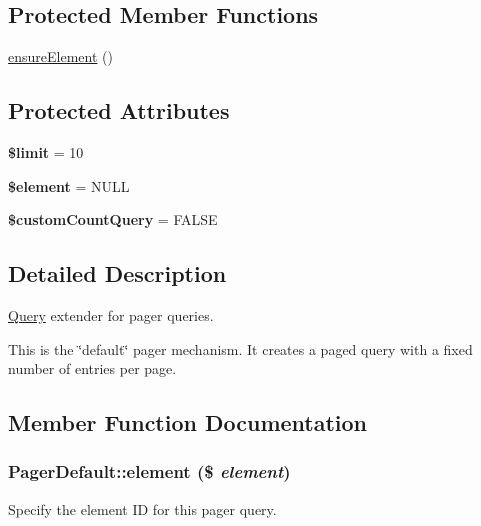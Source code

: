 \subsection*{Protected Member Functions}
\begin{DoxyCompactItemize}
\item 
\hyperlink{classPagerDefault_a80aec4b474390695eded834e365d1b51}{ensureElement} ()
\end{DoxyCompactItemize}
\subsection*{Protected Attributes}
\begin{DoxyCompactItemize}
\item 
\hypertarget{classPagerDefault_aed0d63a76119245ab5fd4ecc06df2453}{
{\bfseries \$limit} = 10}
\label{classPagerDefault_aed0d63a76119245ab5fd4ecc06df2453}

\item 
\hypertarget{classPagerDefault_aec814784b161281d21bd45cf06b3f616}{
{\bfseries \$element} = NULL}
\label{classPagerDefault_aec814784b161281d21bd45cf06b3f616}

\item 
\hypertarget{classPagerDefault_ad4ee98e56947b9ed4791b6c9d742ed38}{
{\bfseries \$customCountQuery} = FALSE}
\label{classPagerDefault_ad4ee98e56947b9ed4791b6c9d742ed38}

\end{DoxyCompactItemize}


\subsection{Detailed Description}
\hyperlink{classQuery}{Query} extender for pager queries.

This is the \char`\"{}default\char`\"{} pager mechanism. It creates a paged query with a fixed number of entries per page. 

\subsection{Member Function Documentation}
\hypertarget{classPagerDefault_a950e555daf95d3af4aeaf23209a183d0}{
\subsubsection[{element}]{\setlength{\rightskip}{0pt plus 5cm}PagerDefault::element (\$ {\em element})}}
\label{classPagerDefault_a950e555daf95d3af4aeaf23209a183d0}
Specify the element ID for this pager query.

